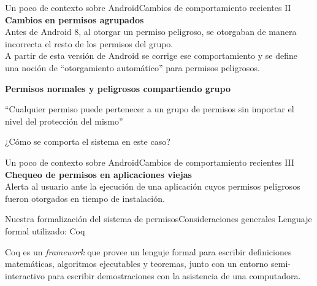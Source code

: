 \documentclass[pdf, handout]{beamer} %
\begin{document}
\begin{frame}{Un poco de contexto sobre Android}{Cambios de comportamiento recientes II}
    \textbf{Cambios en permisos agrupados} \\
    \vspace{10px}
    Antes de Android 8, al otorgar un permiso peligroso, se otorgaban de manera incorrecta el resto
    de los permisos del grupo.\\
    \vspace{5px}
    A partir de esta versión de Android se corrige ese comportamiento y se define una noción de
    ``otorgamiento automático'' para permisos peligrosos.

    \vspace{10px} \pause
    \textbf{Permisos normales y peligrosos compartiendo grupo} \\
    \begin{block}{}
        ``Cualquier permiso puede pertenecer a un grupo de permisos sin importar el nivel del
        protección del mismo''
    \end{block}
    \pause
    ¿Cómo se comporta el sistema en este caso?
\end{frame}

\begin{frame}{Un poco de contexto sobre Android}{Cambios de comportamiento recientes III}
    \textbf{Chequeo de permisos en aplicaciones viejas} \\
    \vspace{10px}
    Alerta al usuario ante la ejecución de una aplicación cuyos permisos peligrosos fueron otorgados
    en tiempo de instalación.
\end{frame}

\begin{frame}{Nuestra formalización del sistema de permisos}{Consideraciones generales}
    Lenguaje formal utilizado: Coq
    \vspace{10px}
    \begin{block}{}
        Coq es un \textit{framework} que provee un lenguje formal para escribir definiciones
        matemáticas, algoritmos ejecutables y teoremas, junto con un entorno semi-interactivo para
        escribir demostraciones con la asistencia de una computadora.
    \end{block}
\end{frame}
\end{document}
